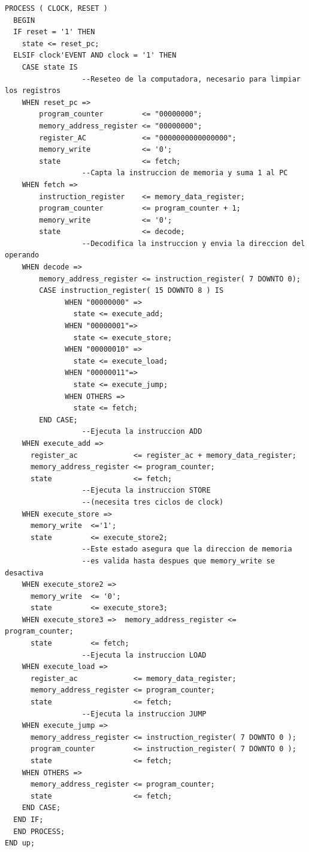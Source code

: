 \begin{lstlisting}[style=vhdl, basicstyle=\footnotesize\ttfamily]
PROCESS ( CLOCK, RESET )
  BEGIN
  IF reset = '1' THEN
    state <= reset_pc;
  ELSIF clock'EVENT AND clock = '1' THEN
    CASE state IS
                  --Reseteo de la computadora, necesario para limpiar los registros                  
    WHEN reset_pc =>
        program_counter         <= "00000000";
        memory_address_register <= "00000000";
        register_AC             <= "0000000000000000";
        memory_write            <= '0';
        state                   <= fetch;
                  --Capta la instruccion de memoria y suma 1 al PC
    WHEN fetch =>
        instruction_register    <= memory_data_register;
        program_counter         <= program_counter + 1;
        memory_write            <= '0';
        state                   <= decode;        
                  --Decodifica la instruccion y envia la direccion del operando
    WHEN decode =>
        memory_address_register <= instruction_register( 7 DOWNTO 0);
        CASE instruction_register( 15 DOWNTO 8 ) IS
              WHEN "00000000" =>
                state <= execute_add;
              WHEN "00000001"=>
                state <= execute_store;
              WHEN "00000010" =>
                state <= execute_load;
              WHEN "00000011"=>
                state <= execute_jump;
              WHEN OTHERS =>
                state <= fetch;
        END CASE;
                  --Ejecuta la instruccion ADD
    WHEN execute_add =>
      register_ac             <= register_ac + memory_data_register;
      memory_address_register <= program_counter;
      state                   <= fetch;
                  --Ejecuta la instruccion STORE
                  --(necesita tres ciclos de clock)
    WHEN execute_store =>
      memory_write  <='1';
      state         <= execute_store2;
                  --Este estado asegura que la direccion de memoria
                  --es valida hasta despues que memory_write se desactiva
    WHEN execute_store2 =>
      memory_write  <= '0';
      state         <= execute_store3;
    WHEN execute_store3 =>  memory_address_register <= program_counter;
      state         <= fetch;
                  --Ejecuta la instruccion LOAD
    WHEN execute_load =>
      register_ac             <= memory_data_register;
      memory_address_register <= program_counter;
      state                   <= fetch;
                  --Ejecuta la instruccion JUMP
    WHEN execute_jump =>  
      memory_address_register <= instruction_register( 7 DOWNTO 0 );
      program_counter         <= instruction_register( 7 DOWNTO 0 );
      state                   <= fetch;
    WHEN OTHERS =>
      memory_address_register <= program_counter;
      state                   <= fetch;
    END CASE;
  END IF;
  END PROCESS;
END up;
\end{lstlisting}
